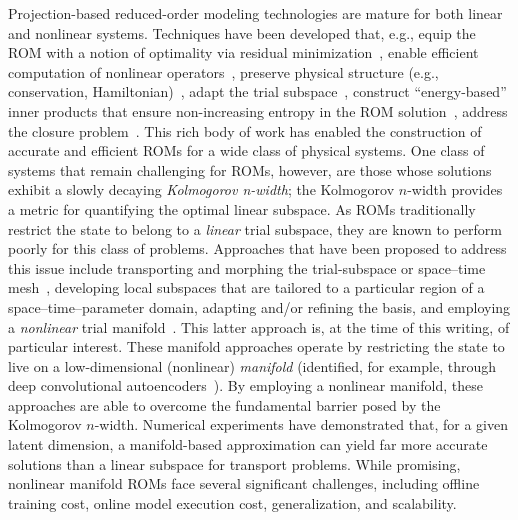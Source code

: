 \documentclass[3p,computermodern,10pt]{elsarticle}
\begin{document}
Projection-based reduced-order modeling technologies are mature for both linear and nonlinear systems. Techniques have been developed that, e.g., equip the ROM with a notion of optimality via residual minimization~\cite{carlberg_lspg,carlberg_gnat,legresley_1,legresley_2,legresley_3,bui_resmin_steady,bui_unsteady,rovas_thesis,carlberg_thesis,bui_thesis,l1, yano_thesis, choi_stlspg,constantine_strom,yuki_stlspg,parish_wls,townePOD}, enable efficient computation of nonlinear operators~\cite{eim,deim,everson_sirovich_gappy,carlberg_gnat,yano19}, preserve physical structure (e.g., conservation, Hamiltonian)~\cite{carlberg_conservative_rom,LALL2003304,carlberg2012spd,structurePreserveBeattie,chaturantabut2016structure,farhat2014dimensional}, adapt the trial subspace~\cite{ETTER2020112931,carlberg_hadaptation,adeim_peherstorfer}, construct ``energy-based'' inner
products that ensure non-increasing entropy in the ROM
solution~\cite{rowley_pod_energyproj,Kalashnikova_sand2014,chan2019entropy},
 address the closure problem~\cite{san_iliescu_geostrophic,iliescu_pod_eddyviscosity,iliescu_vms_pod_ns,Bergmann_pod_vms,iliescu_ciazzo_residual_rom,Wang_ROM_thesis,wentland_apg,Wang:269133,San2018}. This rich body of work has enabled the construction of accurate and efficient ROMs for a wide class of physical systems. One class of systems that remain challenging for ROMs, however, are those whose solutions exhibit a slowly decaying \textit{Kolmogorov n-width}; the Kolmogorov $n$-width provides a metric for quantifying the optimal linear subspace. As ROMs traditionally restrict the state to belong to a \textit{linear} trial subspace, they are known to perform poorly for this class of problems. Approaches that have been proposed to address this issue include transporting and morphing the trial-subspace or space--time mesh~\cite{nair_tsmor,mojgani2020physicsaware,mojgani2017lagrangian,}, developing local subspaces that are tailored to a particular region of a space--time--parameter domain, adapting and/or refining the basis, and employing a \textit{nonlinear} trial manifold~\cite{LEE2020108973,kim2020fast}. This latter approach is, at the time of this writing, of particular interest. These manifold approaches operate by restricting the state to live on a low-dimensional (nonlinear) \textit{manifold} (identified, for example, through deep convolutional autoencoders~\cite{LeeCarlberg}). By employing a nonlinear manifold, these approaches are able to overcome the fundamental barrier posed by the Kolmogorov $n$-width. Numerical experiments have demonstrated that, for a given latent dimension, a manifold-based approximation can yield far more accurate solutions than a linear subspace for transport problems. While promising, nonlinear manifold ROMs face several significant challenges, including offline training cost, online model execution cost, generalization, and scalability. 
\end{document}
